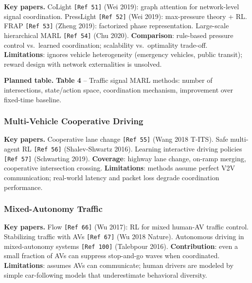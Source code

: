 \documentclass[12pt, a4paper]{article}
\begin{document}
\begin{outline_note}
\textbf{Key papers.}
CoLight \texttt{[Ref\,51]} (Wei 2019): graph attention for network-level
signal coordination.
PressLight \texttt{[Ref\,52]} (Wei 2019): max-pressure theory + RL.
FRAP \texttt{[Ref\,53]} (Zheng 2019): factorized phase representation.
Large-scale hierarchical MARL \texttt{[Ref\,54]} (Chu 2020).
\textbf{Comparison}: rule-based pressure control vs.\ learned coordination;
scalability vs.\ optimality trade-off.
\textbf{Limitations}: ignores vehicle heterogeneity (emergency vehicles,
public transit); reward design with network externalities is unsolved.

\textbf{Planned table.}
\textbf{Table 4} -- Traffic signal MARL methods: number of intersections,
state/action space, coordination mechanism, improvement over fixed-time
baseline.
\end{outline_note}

\subsubsection{Multi-Vehicle Cooperative Driving}

\begin{outline_note}
\textbf{Key papers.}
Cooperative lane change \texttt{[Ref\,55]} (Wang 2018 T-ITS).
Safe multi-agent RL \texttt{[Ref\,56]} (Shalev-Shwartz 2016).
Learning interactive driving policies \texttt{[Ref\,57]} (Schwarting 2019).
\textbf{Coverage}: highway lane change, on-ramp merging, cooperative
intersection crossing.
\textbf{Limitations}: methods assume perfect V2V communication; real-world
latency and packet loss degrade coordination performance.
\end{outline_note}

\subsubsection{Mixed-Autonomy Traffic}

\begin{outline_note}
\textbf{Key papers.}
Flow \texttt{[Ref\,66]} (Wu 2017): RL for mixed human-AV traffic control.
Stabilizing traffic with AVs \texttt{[Ref\,67]} (Wu 2018 Nature).
Autonomous driving in mixed-autonomy systems \texttt{[Ref\,100]}
(Talebpour 2016).
\textbf{Contribution}: even a small fraction of AVs can suppress
stop-and-go waves when coordinated.
\textbf{Limitations}: assumes AVs can communicate; human drivers are
modeled by simple car-following models that underestimate behavioral
diversity.
\end{outline_note}
\end{document}
